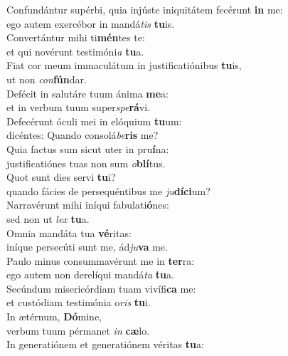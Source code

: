 \evenverse Confundántur supérbi, quia injúste iniquitátem fecérunt \textbf{in} me:~\*\\
\evenverse ego autem exercébor in mandá\textit{tis} \textbf{tu}is.\\
\oddverse Convertántur mihi ti\textbf{mén}tes te:~\*\\
\oddverse et qui novérunt testimóni\textit{a} \textbf{tu}a.\\
\evenverse Fiat cor meum immaculátum in justificatiónibus \textbf{tu}is,~\*\\
\evenverse ut non \textit{con}\textbf{fún}dar.\\
\oddverse Defécit in salutáre tuum ánima \textbf{me}a:~\*\\
\oddverse et in verbum tuum super\textit{spe}\textbf{rá}vi.\\
\evenverse Defecérunt óculi mei in elóquium \textbf{tu}um:~\*\\
\evenverse dicéntes: Quando consolá\textit{be}\textbf{ris} me?\\
\oddverse Quia factus sum sicut uter in pru\textbf{í}na:~\*\\
\oddverse justificatiónes tuas non sum \textit{o}\textbf{blí}tus.\\
\evenverse Quot sunt dies servi \textbf{tu}i?~\*\\
\evenverse quando fácies de persequéntibus me \textit{ju}\textbf{dí}\textbf{ci}um?\\
\oddverse Narravérunt mihi iníqui fabulati\textbf{ó}nes:~\*\\
\oddverse sed non ut \textit{lex} \textbf{tu}a.\\
\evenverse Omnia mandáta tua \textbf{vé}ritas:~\*\\
\evenverse iníque persecúti sunt me, ád\textit{ju}\textbf{va} me.\\
\oddverse Paulo minus consummavérunt me in \textbf{ter}ra:~\*\\
\oddverse ego autem non derelíqui mandá\textit{ta} \textbf{tu}a.\\
\evenverse Secúndum misericórdiam tuam vivífi\textbf{ca} me:~\*\\
\evenverse et custódiam testimónia o\textit{ris} \textbf{tu}i.\\
\oddverse In ætérnum, \textbf{Dó}mine,~\*\\
\oddverse verbum tuum pérmanet \textit{in} \textbf{cæ}lo.\\
\evenverse In generatiónem et generatiónem véritas \textbf{tu}a:~\*\\
